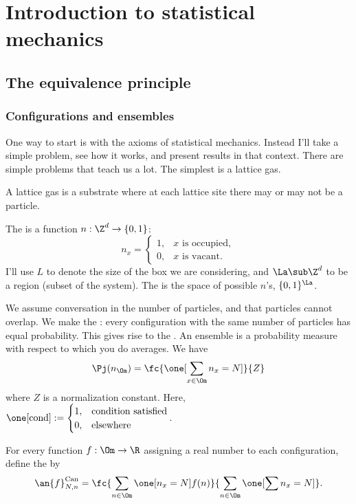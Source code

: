 \chapter{Introduction to statistical mechanics}


\section{The equivalence principle}
\subsection{Configurations and ensembles}
One way to start is with the axioms of statistical mechanics. Instead I'll take a simple problem, see how it works, and present results in that context. There are simple problems that teach us a lot. The simplest is a lattice gas.

A lattice gas is a substrate where at each lattice site there may or may not be a particle. 

The  is a function $n:\Z^d\to \{0,1\}$:
\[
n_x=\begin{cases}
1,&\text{$x$ is occupied},\\
0,&\text{$x$ is vacant}.
\end{cases}
\]
I'll use $L$ to denote the size of the box we are considering, and $\La\sub \Z^d$ to be a region (subset of the system). The  is the space of possible $n$'s, $\{0,1\}^{\La}$.

We assume conversation in the number of particles, and that particles cannot overlap. %
We make the : every configuration with the same number of particles has equal probability. This gives rise to the . An ensemble is a probability measure with respect to which you do averages. We have
\[
\Pj(n_{\Om})= \fc{\one[\sum_{x\in \Om}n_x=N]}{Z}
\]
where $Z$ is a normalization constant.
Here, $\one[\text{cond}] := \begin{cases}
1,&\text{condition satisfied}\\
0,&\text{elsewhere}
\end{cases}$.

For every function $f:\Om\to \R$ assigning a real number to each configuration, define the  by
\[
\an{f}_{N,n}^{\text{Can}} = \fc{\sum_{n\in \Om} \one[n_x=N] f(n)}{\sum_{n\in \Om} \one[\sum n_x=N]}.
\]

